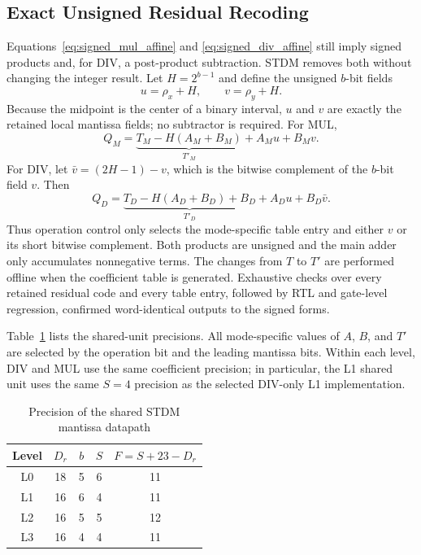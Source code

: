 \documentclass[conference]{IEEEtran}
\begin{document}
\subsection{Exact Unsigned Residual Recoding}
Equations~\eqref{eq:signed_mul_affine} and
\eqref{eq:signed_div_affine} still imply signed products and, for DIV, a
post-product subtraction. STDM removes both without changing the integer
result. Let $H=2^{b-1}$ and define the unsigned $b$-bit fields
\begin{equation}
 u=\rho_x+H,\qquad v=\rho_y+H.
 \label{eq:unsigned_residuals}
\end{equation}
Because the midpoint is the center of a binary interval, $u$ and $v$ are
exactly the retained local mantissa fields; no subtractor is required. For MUL,
\begin{equation}
 Q_M=\underbrace{T_M-H(A_M+B_M)}_{T'_M}+A_Mu+B_Mv.
 \label{eq:unsigned_mul_affine}
\end{equation}
For DIV, let $\bar v=(2H-1)-v$, which is the bitwise complement of the $b$-bit
field $v$. Then
\begin{equation}
 Q_D=\underbrace{T_D-H(A_D+B_D)+B_D}_{T'_D}
       +A_Du+B_D\bar v.
 \label{eq:unsigned_div_affine}
\end{equation}
Thus operation control only selects the mode-specific table entry and either
$v$ or its short bitwise complement. Both products are unsigned and the main
adder only accumulates nonnegative terms. The changes from $T$ to $T'$ are
performed offline when the coefficient table is generated. Exhaustive checks
over every retained residual code and every table entry, followed by RTL and
gate-level regression, confirmed word-identical outputs to the signed forms.

Table~\ref{tab:implementation_precision} lists the shared-unit precisions. All
mode-specific values of $A$, $B$, and $T'$ are selected by the operation bit
and the leading mantissa bits. Within each level, DIV and MUL use the same
coefficient precision; in particular, the L1 shared unit uses the same $S=4$
precision as the selected DIV-only L1 implementation.

\begin{table}[t]
\caption{Precision of the shared STDM mantissa datapath}
\label{tab:implementation_precision}
\centering\small
\begin{tabular}{ccccc}
\toprule
Level & $D_r$ & $b$ & $S$ & $F=S+23-D_r$ \\
\midrule
L0 & 18 & 5 & 6 & 11 \\
L1 & 16 & 6 & 4 & 11 \\
L2 & 16 & 5 & 5 & 12 \\
L3 & 16 & 4 & 4 & 11 \\
\bottomrule
\end{tabular}
\end{table}
\end{document}
